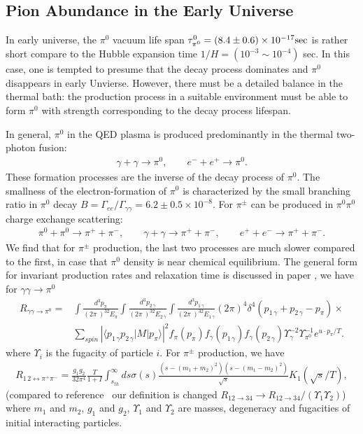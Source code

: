 \documentclass[universe,article,submit,moreauthors,pdftex,a4paper]{Definitions/mdpi}
\begin{document}
\subsection{Pion Abundance in the Early Universe}\label{sec:Pions}
\noindent 
In early universe, the $\pi^0$ vacuum life span $\tau_{\pi^0}^0=(8.4\pm0.6)\times10^{-17} {\rm sec}$ is rather short compare to the Hubble expansion time $1/H=(10^{-3}\sim10^{-4})$ sec. In this case, one is tempted to presume that the decay process dominates and $\pi^0$ disappears in early Unvierse. However, there must be a detailed balance in the thermal bath: the production process in a suitable environment must be able to form $\pi^0$ with strength corresponding to the decay process lifespan. 

In general, $\pi^0$ in the QED plasma is produced predominantly in the thermal two-photon fusion:
\begin{align}
\gamma+\gamma \rightarrow \pi^0 ,\qquad e^-+e^+ \rightarrow \pi^0. 
\end{align}
These formation processes are the inverse of the decay process of $\pi^0$. The smallness of the electron-formation of $\pi^0$ is characterized by the small  branching ratio in $\pi^0$ decay $B=\Gamma_{ee}/\Gamma_{\gamma\gamma}=6.2\pm 0.5\times10^{-8}$.
For $\pi^{\pm}$ can be produced in $\pi^0\pi^0$ charge exchange scattering:
\begin{align}
\pi^0 + \pi^0 \rightarrow \pi^{+} + \pi^{-}, \qquad\gamma+\gamma \rightarrow \pi^{+} + \pi^{-}, \qquad
e^+ + e^- \rightarrow \pi^{+} + \pi^{-}. 
\end{align}
We find  that for $\pi^{\pm}$ production, the last two processes are much slower compared to the first, in case that $\pi^0$ density is near chemical equilibrium. The general form for invariant production rates and relaxation time is discussed in paper \cite{Kuznetsova:2008jt}, we have for $\gamma\gamma\to\pi^0$
\begin{align}
R_{\gamma\gamma\to\pi^0}=&\int\frac{d^{3}{p_{\pi}}}{(2\pi\ )^32E_{\pi}}
   \int\frac{d^{3} {p_{2\,\gamma}}}{(2\pi\ )^32E_{2\,\gamma}}
   \int\frac{d^{3}{p_{1\,\gamma}}} {(2\pi\ )^32E_{1\,\gamma} }\left(2\pi\right)^{4}
 \delta^{4}\left(p_{1\,\gamma}+p_{2\,\gamma}-p_{\pi}\right)\times \nonumber\\ &
  \sum_{spin}\left|\langle p_{1\,\gamma}p_{2\,\gamma}\left| M\right|p_{\pi}\rangle\right|^{2}
   f_{\pi}(p_{\pi})f_{\gamma}(p_{1\,\gamma})f_{\gamma}(p_{2\,\gamma})
 \Upsilon^{-2}_{\gamma}\Upsilon_{\pi^{0}}^{-1}e^{u \cdot p_{\pi}/T}. \label{pi0pr}
 \end{align}
where $\Upsilon_i$ is the fugacity of particle $i$. For $\pi^\pm$ production, we have
\begin{align}
{R_{1\,2 \leftrightarrow \pi^+\pi^-}} = \frac{g_1g_2}{32\pi^4}\frac{T}{1+I}
\int_{s_{th}}^{\infty}ds\sigma(s)\frac{(s-(m_{1}+m_2)^2)(s-(m_1-m_2)^2)}{\sqrt{s}}K_1(\sqrt{s}/T),
\end{align}
(compared to reference~\cite{Letessier:2002gp} our definition is changed 
$R_{12\rightarrow 34} \rightarrow 
R_{12 \rightarrow 34}/(\Upsilon_1 \Upsilon_2)$)
where $m_1$ and $m_2$, $g_1$ and $g_2$, $\Upsilon_1$ and $\Upsilon_2$ are masses, degeneracy and fugacities of initial interacting particles. 
\end{document}
